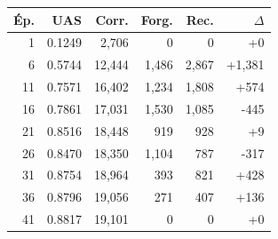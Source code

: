 \begin{table}[ht]
\hfill
\begin{minipage}[t]{0.42\linewidth}
\centering\tiny
\begin{tabular}{rrrrrr}
\toprule
\textbf{Ép.} & \textbf{UAS} & \textbf{Corr.} & \textbf{Forg.} & \textbf{Rec.} & \textbf{$\Delta$} \\
\midrule
1 & 0.1249 & 2,706 & 0 & 0 & +0 \\
6 & 0.5744 & 12,444 & 1,486 & 2,867 & +1,381 \\
11 & 0.7571 & 16,402 & 1,234 & 1,808 & +574 \\
16 & 0.7861 & 17,031 & 1,530 & 1,085 & -445 \\
21 & 0.8516 & 18,448 & 919 & 928 & +9 \\
26 & 0.8470 & 18,350 & 1,104 & 787 & -317 \\
31 & 0.8754 & 18,964 & 393 & 821 & +428 \\
36 & 0.8796 & 19,056 & 271 & 407 & +136 \\
41 & 0.8817 & 19,101 & 0 & 0 & +0 \\
\bottomrule
\end{tabular}
\end{minipage}
\end{table}
